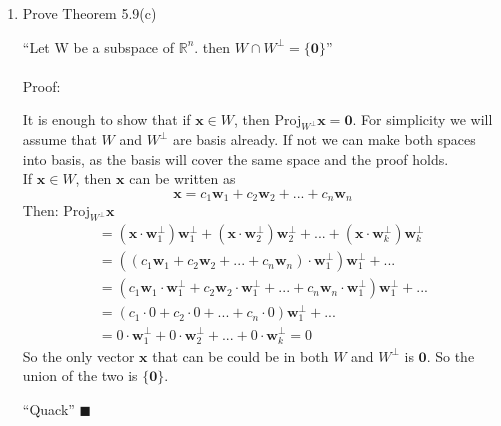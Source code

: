 \documentclass{article}
\newcommand\tab[1][1cm]{\hspace*{#1}}
\begin{document}
\begin{enumerate}
\item
\tab Prove Theorem 5.9(c)\par
``Let W be a subspace of $\mathbb{R}^n$. then $W \cap W^{\perp} = \{\textbf{0}\}$''\\\\
Proof:\par
It is enough to show that if $\textbf{x} \in W$, then Proj$_{W^{\perp}} \textbf{x} = \textbf{0}$. For simplicity we will assume that $W$ and $W^{\perp}$ are basis already. If not we can make both spaces into basis, as the basis will cover the same space and the proof holds.\\
If $\textbf{x} \in W $, then $\textbf{x} $ can be written as 
$$\textbf{x} = c_1 \textbf{w}_1 + c_2 \textbf{w}_2 + ... + c_n \textbf{w}_n$$
Then: Proj$_{W^{\perp}}\textbf{x}$ 
\[
\begin{array}{c}
=(\textbf{x}\cdot\textbf{w}_1^{\perp})\textbf{w}_1^{\perp} + (\textbf{x}\cdot\textbf{w}_2^{\perp})\textbf{w}_2^{\perp} + ... +
(\textbf{x}\cdot\textbf{w}_k^{\perp})\textbf{w}_k^{\perp}\\
=((c_1 \textbf{w}_1 + c_2 \textbf{w}_2 + ... + c_n \textbf{w}_n)\cdot\textbf{w}_1^{\perp})\textbf{w}_1^{\perp} + ...\\
=(c_1 \textbf{w}_1\cdot\textbf{w}_1^{\perp} + c_2 \textbf{w}_2\cdot\textbf{w}_1^{\perp} + ... + c_n \textbf{w}_n\cdot\textbf{w}_1^{\perp})\textbf{w}_1^{\perp} + ...\\
=(c_1 \cdot 0 + c_2 \cdot 0 + ... + c_n \cdot 0)\textbf{w}_1^{\perp} + ...\\
= 0 \cdot \textbf{w}_1^{\perp} + 0 \cdot \textbf{w}_2^{\perp} + ... + 0 \cdot \textbf{w}_k^{\perp} = 0
\end{array}
\]
So the only vector $\textbf{x}$ that can be could be in both $W$ and $W^{\perp}$ is $\textbf{0}$. So the union of the two is $\{\textbf{0}\}$.
\par
{\raggedleft ``Quack''  $\blacksquare$\\}



\end{enumerate}
\end{document}
